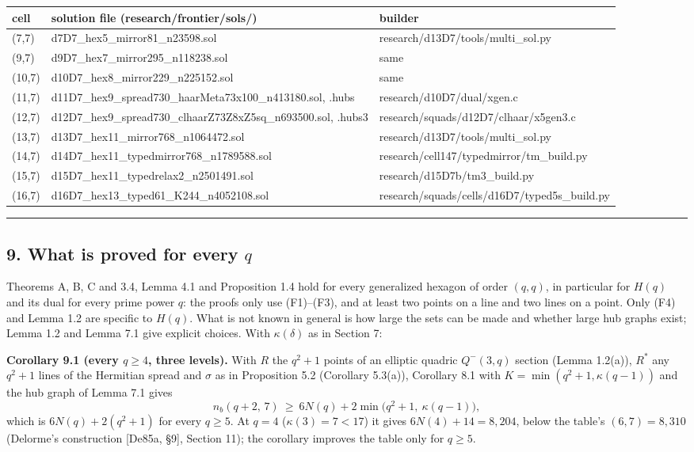\documentclass[
  11pt,
]{article}
\begin{document}
\begin{longtable}[]{@{}lll@{}}
\toprule\noalign{}
cell & solution file (research/frontier/sols/) & builder \\
\midrule\noalign{}
\endhead
\bottomrule\noalign{}
\endlastfoot
(7,7) & d7D7\_hex5\_mirror81\_n23598.sol & research/d13D7/tools/multi\_sol.py \\
(9,7) & d9D7\_hex7\_mirror295\_n118238.sol & same \\
(10,7) & d10D7\_hex8\_mirror229\_n225152.sol & same \\
(11,7) & d11D7\_hex9\_spread730\_haarMeta73x100\_n413180.sol, .hubs & research/d10D7/dual/xgen.c \\
(12,7) & d12D7\_hex9\_spread730\_clhaarZ73Z8xZ5sq\_n693500.sol, .hubs3 & research/squads/d12D7/clhaar/x5gen3.c \\
(13,7) & d13D7\_hex11\_mirror768\_n1064472.sol & research/d13D7/tools/multi\_sol.py \\
(14,7) & d14D7\_hex11\_typedmirror768\_n1789588.sol & research/cell147/typedmirror/tm\_build.py \\
(15,7) & d15D7\_hex11\_typedrelax2\_n2501491.sol & research/d15D7b/tm3\_build.py \\
(16,7) & d16D7\_hex13\_typed61\_K244\_n4052108.sol & research/squads/cells/d16D7/typed5s\_build.py \\
\end{longtable}

\begin{center}\rule{0.5\linewidth}{0.5pt}\end{center}

\hypertarget{what-is-proved-for-every-q}{%
\subsection{\texorpdfstring{9. What is proved for every
\(q\)}{9. What is proved for every q}}\label{what-is-proved-for-every-q}}

Theorems A, B, C and 3.4, Lemma 4.1 and Proposition 1.4 hold for every generalized hexagon of order \((q,q)\), in
particular for \(H(q)\) and its dual for every prime power \(q\): the proofs only use (F1)--(F3), and at least two
points on a line and two lines on a point. Only (F4) and Lemma 1.2 are specific to \(H(q)\). What is not known in
general is how large the sets can be made and whether large hub graphs exist; Lemma 1.2 and Lemma 7.1 give explicit
choices. With \(\kappa(\delta)\) as in Section 7:

\textbf{Corollary 9.1 (every \(q\ge 4\), three levels).} With \(R\) the \(q^2+1\) points of an elliptic quadric
\(Q^-(3,q)\) section (Lemma 1.2(a)), \(R^*\) any \(q^2+1\) lines of the Hermitian spread and \(\sigma\) as in
Proposition 5.2 (Corollary 5.3(a)), Corollary 8.1 with \(K = \min(q^2+1,\kappa(q-1))\) and the hub graph of Lemma 7.1
gives \[n_b(q+2,\,7)\ \ge\ 6N(q) + 2\min\bigl(q^2+1,\ \kappa(q-1)\bigr),\] which is \(6N(q)+2(q^2+1)\) for every
\(q\ge 5\). At \(q = 4\) (\(\kappa(3) = 7 < 17\)) it gives \(6N(4)+14 = 8{,}204\), below the table's \((6,7) = 8{,}310\)
(Delorme's construction {[}De85a, §9{]}, Section 11); the corollary improves the table only for \(q\ge 5\).
\end{document}
